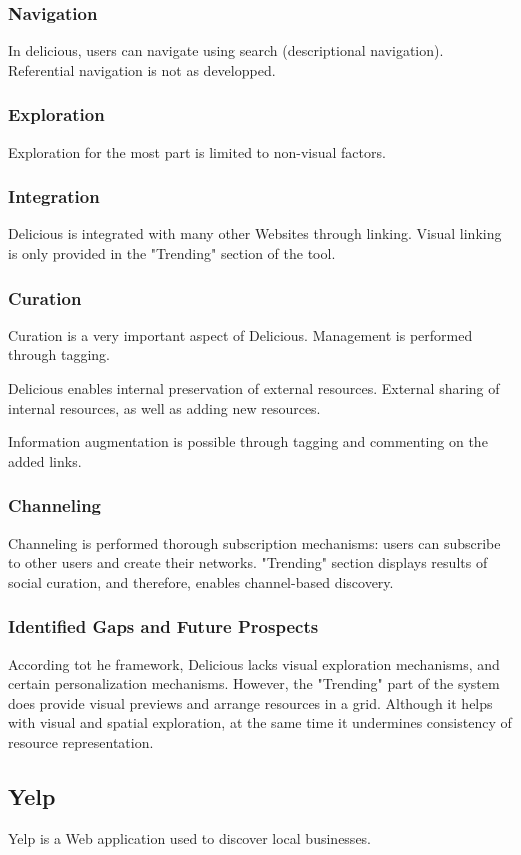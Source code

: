 {{{\subsubsection{Navigation}
In delicious, users can navigate using search (descriptional navigation). Referential navigation is not as developped.

}
{\subsubsection{Exploration}
Exploration for the most part is limited to non-visual factors.
}
{\subsubsection{Integration}
Delicious is integrated with many other Websites through linking. Visual linking is only provided in the "Trending" section of the tool.
}
{\subsubsection{Curation}
Curation is a very important aspect of Delicious. Management is performed through tagging. 

Delicious enables internal preservation of external resources. External sharing of internal resources, as well as adding new resources. 

Information augmentation is possible through tagging and commenting on the added links.
}
{\subsubsection{Channeling}
Channeling is performed thorough subscription mechanisms: users can subscribe to other users and create their networks. 
"Trending" section displays results of social curation, and therefore, enables channel-based discovery.
}
{\subsubsection{Identified Gaps and Future Prospects}
According tot he framework, Delicious lacks visual exploration mechanisms, and certain personalization mechanisms. However, the "Trending" part of the system does provide visual previews and arrange resources in a grid. Although it helps with visual and spatial exploration, at the same time it undermines consistency of resource representation. 
} 
} %


{\subsection{Yelp}
Yelp is a Web application used to discover local businesses. 

}}

